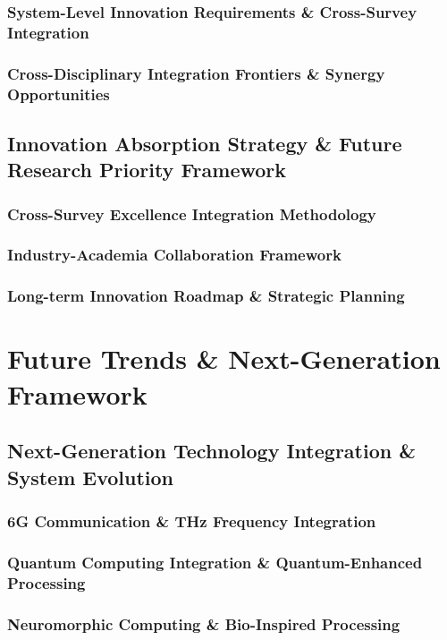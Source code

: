 \documentclass[journal]{IEEEtran}
\begin{document}
{\subsubsection{System-Level Innovation Requirements \& Cross-Survey Integration}
\subsubsection{Cross-Disciplinary Integration Frontiers \& Synergy Opportunities}

\subsection{Innovation Absorption Strategy \& Future Research Priority Framework}
\subsubsection{Cross-Survey Excellence Integration Methodology}
\subsubsection{Industry-Academia Collaboration Framework}
\subsubsection{Long-term Innovation Roadmap \& Strategic Planning}

\section{Future Trends \& Next-Generation Framework}
\label{sec:future}

\subsection{Next-Generation Technology Integration \& System Evolution}
\subsubsection{6G Communication \& THz Frequency Integration}
\subsubsection{Quantum Computing Integration \& Quantum-Enhanced Processing}
\subsubsection{Neuromorphic Computing \& Bio-Inspired Processing}

}
\end{document}
